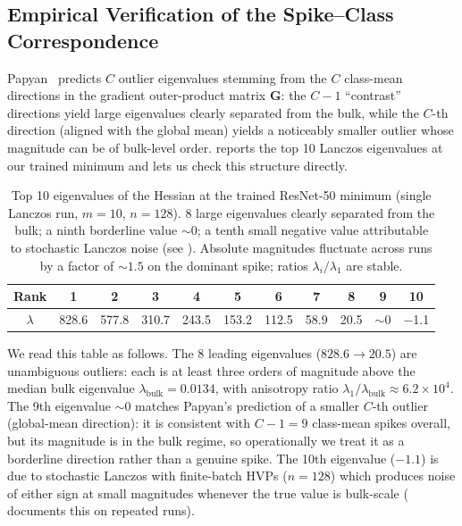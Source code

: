 \documentclass[11pt,a4paper]{article}
\newcommand{\mat}[1]{\bm{#1}}
\begin{document}
\subsection{Empirical Verification of the Spike--Class Correspondence}

Papyan~\cite{papyan2020} predicts $C$ outlier eigenvalues stemming from
the $C$ class-mean directions in the gradient outer-product matrix
$\mat{G}$: the $C{-}1$ ``contrast'' directions yield large eigenvalues
clearly separated from the bulk, while the $C$-th direction (aligned
with the global mean) yields a noticeably smaller outlier whose
magnitude can be of bulk-level order.  reports the
top 10 Lanczos eigenvalues at our trained minimum and lets us check
this structure directly.

\begin{table}[ht]
\centering
\caption{Top 10 eigenvalues of the Hessian at the trained ResNet-50
minimum (single Lanczos run, $m{=}10$, $n{=}128$). 8 large eigenvalues
clearly separated from the bulk; a ninth borderline value $\sim 0$;
a tenth small negative value attributable to stochastic Lanczos noise
(see ). Absolute magnitudes fluctuate
across runs by a factor of ${\sim}1.5$ on the dominant spike;
ratios $\lambda_i/\lambda_1$ are stable.}
\label{tab:eigenvalues}
\begin{tabular}{ccccccccccc}
\toprule
Rank & 1 & 2 & 3 & 4 & 5 & 6 & 7 & 8 & 9 & 10 \\
\midrule
$\lambda$ & 828.6 & 577.8 & 310.7 & 243.5 & 153.2 & 112.5 & 58.9
  & 20.5 & $\sim$0 & $-$1.1 \\
\bottomrule
\end{tabular}
\end{table}

We read this table as follows. The 8 leading eigenvalues
($828.6 \to 20.5$) are unambiguous outliers: each is at least three
orders of magnitude above the median bulk eigenvalue
$\lambda_{\mathrm{bulk}} = 0.0134$, with anisotropy ratio
$\lambda_1/\lambda_{\mathrm{bulk}} \approx 6.2 \times 10^4$. The 9th
eigenvalue $\sim 0$ matches Papyan's prediction of a smaller $C$-th
outlier (global-mean direction): it is consistent with $C{-}1=9$
class-mean spikes overall, but its magnitude is in the bulk regime, so
operationally we treat it as a borderline direction rather than a
genuine spike. The 10th eigenvalue ($-1.1$) is due to stochastic Lanczos with
finite-batch HVPs ($n{=}128$) which produces noise of either sign at small
magnitudes whenever the true value is bulk-scale (
documents this on repeated runs).
\end{document}
